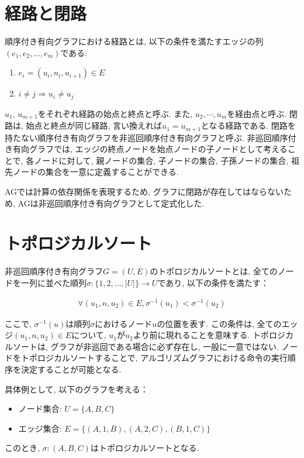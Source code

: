 \documentclass[11pt,oneside,openany,report]{jsbook}
\begin{document}
\section{経路と閉路}
順序付き有向グラフにおける経路とは, 以下の条件を満たすエッジの列$(e_1, e_2, \ldots, e_m)$である:
\begin{enumerate}
  \item $e_i = (u_i, n_i, u_{i+1}) \in E$
  \item $i \neq j \Rightarrow u_i \neq u_j$
\end{enumerate}
\noindent
$u_1$, $u_{m+1}$をそれぞれ経路の始点と終点と呼ぶ. また, $u_2, \cdots, u_m$を経由点と呼ぶ. 閉路は, 始点と終点が同じ経路, 言い換えれば$u_1 = u_{m+1}$となる経路である. 閉路を持たない順序付き有向グラフを非巡回順序付き有向グラフと呼ぶ. 非巡回順序付き有向グラフでは, エッジの終点ノードを始点ノードの子ノードとして考えることで, 各ノードに対して, 親ノードの集合, 子ノードの集合, 子孫ノードの集合, 祖先ノードの集合を一意に定義することができる.

AGでは計算の依存関係を表現するため, グラフに閉路が存在してはならないため, AGは非巡回順序付き有向グラフとして定式化した.

\section{トポロジカルソート}
非巡回順序付き有向グラフ$G = (U, E)$のトポロジカルソートとは, 全てのノードを一列に並べた順列$\sigma: \{1,2,\ldots,|U|\} \rightarrow U$であり, 以下の条件を満たす：

\begin{gather*}
\forall (u_1, n, u_2) \in E, \sigma^{-1}(u_1) < \sigma^{-1}(u_2)
\end{gather*}

ここで, $\sigma^{-1}(u)$は順列$\sigma$におけるノード$u$の位置を表す. この条件は, 全てのエッジ$(u_1,n,u_2) \in E$について, $u_1$が$u_2$より前に現れることを意味する. トポロジカルソートは, グラフが非巡回である場合に必ず存在し, 一般に一意ではない. ノードをトポロジカルソートすることで, アルゴリズムグラフにおける命令の実行順序を決定することが可能となる.

具体例として, 以下のグラフを考える：
\begin{itemize}
   \item ノード集合: $U = \{A, B, C\}$
   \item エッジ集合: $E = \{(A,1,B), (A,2,C), (B,1,C)\}$
\end{itemize}
\noindent
このとき, $\sigma: (A,B,C)$はトポロジカルソートとなる.
\end{document}
